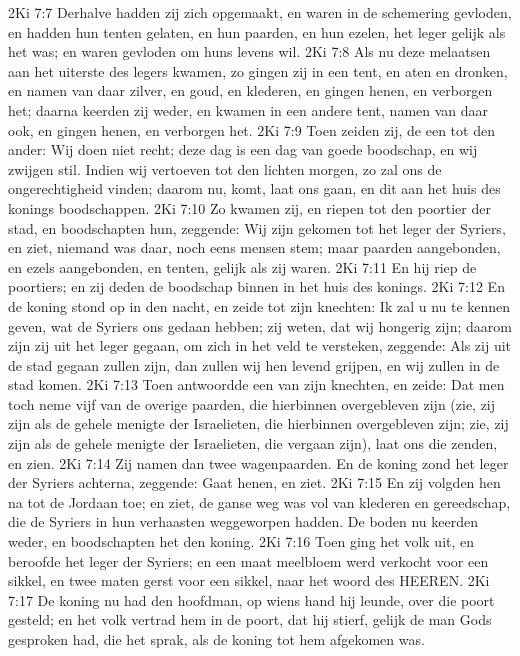 2Ki 7:7  Derhalve hadden zij zich opgemaakt, en waren in de schemering gevloden, en hadden hun tenten gelaten, en hun paarden, en hun ezelen, het leger gelijk als het was; en waren gevloden om huns levens wil.
2Ki 7:8  Als nu deze melaatsen aan het uiterste des legers kwamen, zo gingen zij in een tent, en aten en dronken, en namen van daar zilver, en goud, en klederen, en gingen henen, en verborgen het; daarna keerden zij weder, en kwamen in een andere tent, namen van daar ook, en gingen henen, en verborgen het.
2Ki 7:9  Toen zeiden zij, de een tot den ander: Wij doen niet recht; deze dag is een dag van goede boodschap, en wij zwijgen stil. Indien wij vertoeven tot den lichten morgen, zo zal ons de ongerechtigheid vinden; daarom nu, komt, laat ons gaan, en dit aan het huis des konings boodschappen.
2Ki 7:10  Zo kwamen zij, en riepen tot den poortier der stad, en boodschapten hun, zeggende: Wij zijn gekomen tot het leger der Syriers, en ziet, niemand was daar, noch eens mensen stem; maar paarden aangebonden, en ezels aangebonden, en tenten, gelijk als zij waren.
2Ki 7:11  En hij riep de poortiers; en zij deden de boodschap binnen in het huis des konings.
2Ki 7:12  En de koning stond op in den nacht, en zeide tot zijn knechten: Ik zal u nu te kennen geven, wat de Syriers ons gedaan hebben; zij weten, dat wij hongerig zijn; daarom zijn zij uit het leger gegaan, om zich in het veld te versteken, zeggende: Als zij uit de stad gegaan zullen zijn, dan zullen wij hen levend grijpen, en wij zullen in de stad komen.
2Ki 7:13  Toen antwoordde een van zijn knechten, en zeide: Dat men toch neme vijf van de overige paarden, die hierbinnen overgebleven zijn (zie, zij zijn als de gehele menigte der Israelieten, die hierbinnen overgebleven zijn; zie, zij zijn als de gehele menigte der Israelieten, die vergaan zijn), laat ons die zenden, en zien.
2Ki 7:14  Zij namen dan twee wagenpaarden. En de koning zond het leger der Syriers achterna, zeggende: Gaat henen, en ziet.
2Ki 7:15  En zij volgden hen na tot de Jordaan toe; en ziet, de ganse weg was vol van klederen en gereedschap, die de Syriers in hun verhaasten weggeworpen hadden. De boden nu keerden weder, en boodschapten het den koning.
2Ki 7:16  Toen ging het volk uit, en beroofde het leger der Syriers; en een maat meelbloem werd verkocht voor een sikkel, en twee maten gerst voor een sikkel, naar het woord des HEEREN.
2Ki 7:17  De koning nu had den hoofdman, op wiens hand hij leunde, over die poort gesteld; en het volk vertrad hem in de poort, dat hij stierf, gelijk de man Gods gesproken had, die het sprak, als de koning tot hem afgekomen was.
